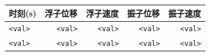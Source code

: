 \begin{tabular}{lrrrr}
\toprule
\textbf{时刻(s)} & \textbf{浮子位移} & \textbf{浮子速度} & \textbf{振子位移} & \textbf{振子速度} \\\midrule
\texttt{<val>} & \texttt{<val>} & \texttt{<val>} & \texttt{<val>} & \texttt{<val>} \\
\texttt{<val>} & \texttt{<val>} & \texttt{<val>} & \texttt{<val>} & \texttt{<val>} \\\bottomrule
\end{tabular}
